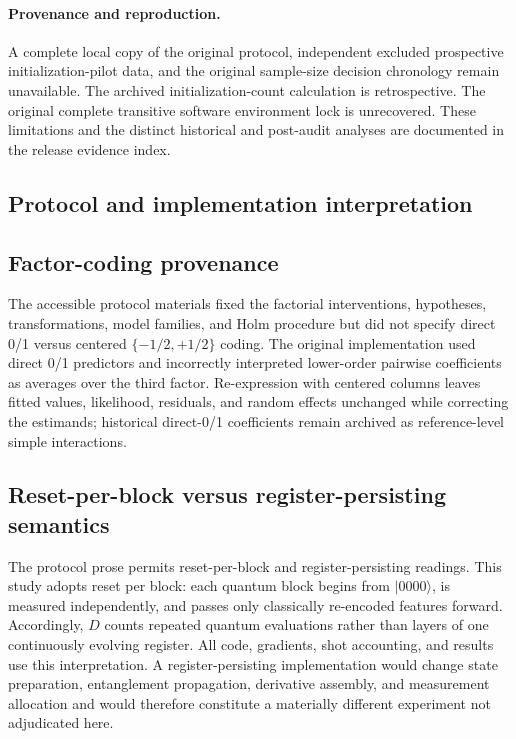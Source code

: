 \documentclass[pdflatex,sn-basic,Numbered]{sn-jnl}
\begin{document}
\paragraph{Provenance and reproduction.}
A complete local copy of the original protocol, independent excluded prospective initialization-pilot data, and the original sample-size decision chronology remain unavailable. The archived initialization-count calculation is retrospective. The original complete transitive software environment lock is unrecovered. These limitations and the distinct historical and post-audit analyses are documented in the release evidence index.

\begin{appendices}
\section{Protocol and implementation interpretation}

\subsection{Factor-coding provenance}

The accessible protocol materials fixed the factorial interventions, hypotheses, transformations, model families, and Holm procedure but did not specify direct 0/1 versus centered $\{-1/2,+1/2\}$ coding. The original implementation used direct 0/1 predictors and incorrectly interpreted lower-order pairwise coefficients as averages over the third factor. Re-expression with centered columns leaves fitted values, likelihood, residuals, and random effects unchanged while correcting the estimands; historical direct-0/1 coefficients remain archived as reference-level simple interactions.

\subsection{Reset-per-block versus register-persisting semantics}

The protocol prose permits reset-per-block and register-persisting readings. This study adopts reset per block: each quantum block begins from $\lvert0000\rangle$, is measured independently, and passes only classically re-encoded features forward. Accordingly, $D$ counts repeated quantum evaluations rather than layers of one continuously evolving register. All code, gradients, shot accounting, and results use this interpretation. A register-persisting implementation would change state preparation, entanglement propagation, derivative assembly, and measurement allocation and would therefore constitute a materially different experiment not adjudicated here.
\end{appendices}
\end{document}
